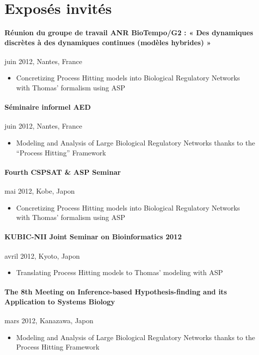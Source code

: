 \section{Exposés invités}

\paragraph{Réunion du groupe de travail ANR BioTempo/G2 : « Des dynamiques discrètes à des dynamiques continues (modèles hybrides) »}
juin 2012, Nantes, France
\begin{itemize}
\item[] Concretizing Process Hitting models into Biological Regulatory Networks with Thomas' formalism using ASP
\end{itemize}

\paragraph{Séminaire informel AED}
juin 2012, Nantes, France
\begin{itemize}
\item[] Modeling and Analysis of Large Biological Regulatory Networks thanks to the “Process Hitting” Framework
\end{itemize}

\paragraph{Fourth CSPSAT \& ASP Seminar}
mai 2012, Kobe, Japon
\begin{itemize}
\item[] Concretizing Process Hitting models into Biological Regulatory Networks with Thomas' formalism using ASP
\end{itemize}

\paragraph{KUBIC-NII Joint Seminar on Bioinformatics 2012}
avril 2012, Kyoto, Japon
\begin{itemize}
\item[] Translating Process Hitting models to Thomas' modeling with ASP
\end{itemize}

\paragraph{The 8th Meeting on Inference-based Hypothesis-finding and its Application to Systems Biology}
mars 2012, Kanazawa, Japon
\begin{itemize}
\item[] Modeling and Analysis of Large Biological Regulatory Networks thanks to the Process Hitting Framework
\end{itemize}



